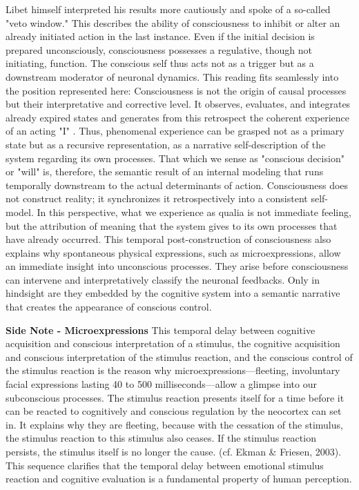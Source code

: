 Libet himself interpreted his results more cautiously and spoke of a so-called "veto window."
This describes the ability of consciousness to inhibit or alter an already initiated action in the last instance.
Even if the initial decision is prepared unconsciously, consciousness possesses a regulative, though not initiating, function.
The conscious self thus acts not as a trigger but as a downstream moderator of neuronal dynamics.
This reading fits seamlessly into the position represented here: Consciousness is not the origin of causal processes but their interpretative and corrective level.
It observes, evaluates, and integrates already expired states and generates from this retrospect the coherent experience of an acting "I" \cite{Libet1993,Wegner2002,Soon2008}.
Thus, phenomenal experience can be grasped not as a primary state but as a recursive representation, as a narrative self-description of the system regarding its own processes.
That which we sense as "conscious decision" or "will" is, therefore, the semantic result of an internal modeling that runs temporally downstream to the actual determinants of action.
Consciousness does not construct reality; it synchronizes it retrospectively into a consistent self-model.
In this perspective, what we experience as qualia is not immediate feeling, but the attribution of meaning that the system gives to its own processes that have already occurred.
This temporal post-construction of consciousness also explains why spontaneous physical expressions, such as microexpressions, allow an immediate insight into unconscious processes.
They arise before consciousness can intervene and interpretatively classify the neuronal feedbacks.
Only in hindsight are they embedded by the cognitive system into a semantic narrative that creates the appearance of conscious control.

\textbf{Side Note - Microexpressions}
This temporal delay between cognitive acquisition and conscious interpretation of a stimulus, the cognitive acquisition and conscious interpretation of the stimulus reaction, and the conscious control of the stimulus reaction is the reason why microexpressions—fleeting, involuntary facial expressions lasting 40 to 500 milliseconds—allow a glimpse into our subconscious processes.
The stimulus reaction presents itself for a time before it can be reacted to cognitively and conscious regulation by the neocortex can set in.
It explains why they are fleeting, because with the cessation of the stimulus, the stimulus reaction to this stimulus also ceases.
If the stimulus reaction persists, the stimulus itself is no longer the cause. (cf. Ekman & Friesen, 2003).
This sequence clarifies that the temporal delay between emotional stimulus reaction and cognitive evaluation is a fundamental property of human perception.

